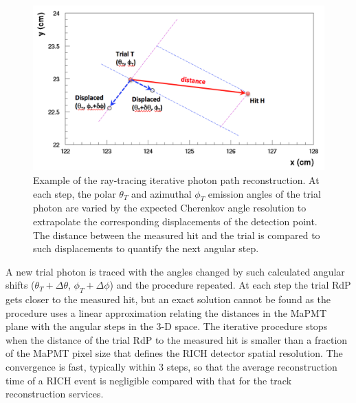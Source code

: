 \begin{figure}[t]
\begin{center}
\includegraphics[width=1.0\columnwidth]{pics/ray_trace_example.png}
\end{center}
\caption{Example of the ray-tracing iterative photon path reconstruction. At each step, the polar $\theta_T$
  and azimuthal $\phi_T$ emission angles of the trial photon are varied by the expected Cherenkov angle
  resolution to extrapolate the corresponding displacements of the detection point. The distance between the
  measured hit and the trial is compared to such displacements to quantify the next angular step.}
\label{Fig:RayAlgo}
\end{figure}

A new trial photon is traced with the angles changed by such calculated angular shifts ($\theta_T + \Delta \theta$,
$\phi_T + \Delta \phi$) and the procedure repeated. At each step the trial RdP gets closer to the measured hit, but
an exact solution cannot be found as the procedure uses a linear approximation relating the distances in the MaPMT
plane with the angular steps in the 3-D space. The iterative procedure stops when the distance of the trial RdP to the
measured hit is smaller than a fraction of the MaPMT pixel size that defines the RICH detector spatial resolution.
The convergence is fast, typically within 3 steps, so that the average reconstruction time of a RICH event is 
negligible compared with that for the track reconstruction services.


